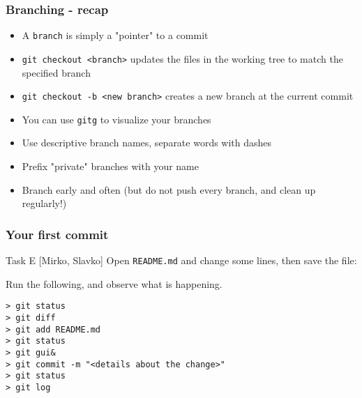

\begin{frame}[fragile]

\frametitle{Branching - recap}

\begin{itemize}
\item A \texttt{branch} is simply a "pointer" to a commit
\item \texttt{git checkout <branch>} updates the files in the working tree to match the specified branch
\item \texttt{git checkout -b <new branch>} creates a new branch at the current commit
\item You can use \texttt{gitg} to visualize your branches
\item Use descriptive branch names, separate words with dashes
\item Prefix "private" branches with your name
\item Branch early and often (but do not push every branch, and clean up regularly!)
\end{itemize}	
	
\end{frame}




\begin{frame}[fragile]
	\frametitle{Your first commit}
	
	\begin{block}{Task E [Mirko, Slavko]}
	Open \texttt{README.md} and change some lines, then save the file:

Run the following, and observe what is happening.

	\begin{verbatim}
> git status
> git diff
> git add README.md
> git status
> git gui&
> git commit -m "<details about the change>"
> git status
> git log
	\end{verbatim}
	
	\end{block}
	
\end{frame}




